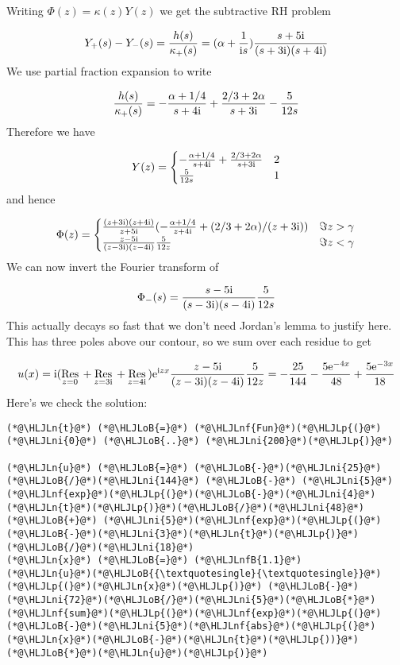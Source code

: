 \documentclass[12pt,landscape]{article}
\newcommand{\HLJLn}[1]{#1}
\newcommand{\HLJLnf}[1]{\textcolor[RGB]{66,102,213}{#1}}
\newcommand{\HLJLnfB}[1]{\textcolor[RGB]{59,151,46}{#1}}
\newcommand{\HLJLni}[1]{\textcolor[RGB]{59,151,46}{#1}}
\newcommand{\HLJLoB}[1]{\textcolor[RGB]{102,102,102}{\textbf{#1}}}
\newcommand{\HLJLp}[1]{#1}
\def\I{ {\rm i} }
\def\E{ {\rm e} }
\def\Res_#1{\underset{#1}{\rm Res}\,}
\begin{document}
{Writing $\Phi(z) = \kappa(z) Y(z)$ we get the subtractive RH problem

\[
Y_+(s) - Y_-(s) = {h(s) \over \kappa_+(s)} =  (\alpha + {1 \over \I s}) {s + 5 \I \over (s + 3 \I)(s + 4 \I)}
\]
We use partial fraction expansion to write

\[
{h(s) \over \kappa_+(s)} = -{\alpha + 1/4 \over s+4 \I} + {2/3 + 2 \alpha \over s+3 \I} - {5 \over 12 s}
\]
Therefore we have

\[
Y(z) = \begin{cases}
-{\alpha + 1/4 \over s+4 \I} + {2/3 + 2 \alpha \over s+3 \I} & 2 \\
        {5 \over 12 s} &1
\end{cases}
\]
and hence

\[
\Phi(z) =      \begin{cases}
{(z+3\I)(z+4\I) \over z+5\I} (-{\ensuremath{\alpha}+1/4 \over z+4\I} + (2/3 + 2\ensuremath{\alpha})/(z+3\I)) & \Im z > \gamma \\
        {z-5\I \over (z-3\I)(z-4\I)} {5 \over 12z}& \Im z < \gamma
        \end{cases}
\]
We can now invert the Fourier transform of

\[
\Phi_-(s) =         {s-5\I \over (s-3\I)(s-4\I)} {5 \over 12s}
\]
This actually decays so fast that we don't need Jordan's lemma to justify here. This has three poles above our contour, so we sum over each residue to get

\[
u(x) = \I (\Res_{z = 0} +\Res_{z = 3 \I } +\Res_{z = 4\I} )      \E^{\I z x }   {z-5\I \over (z-3\I)(z-4\I)} {5 \over 12z} =  -{25 \over 144} - {5 \E^{-4 x}  \over 48} + {5 \E^{-3 x} \over 18}
\]
Here's we check the solution:


\begin{lstlisting}
(*@\HLJLn{t}@*) (*@\HLJLoB{=}@*) (*@\HLJLnf{Fun}@*)(*@\HLJLp{(}@*)(*@\HLJLni{0}@*) (*@\HLJLoB{..}@*) (*@\HLJLni{200}@*)(*@\HLJLp{)}@*)

(*@\HLJLn{u}@*) (*@\HLJLoB{=}@*) (*@\HLJLoB{-}@*)(*@\HLJLni{25}@*)(*@\HLJLoB{/}@*)(*@\HLJLni{144}@*) (*@\HLJLoB{-}@*) (*@\HLJLni{5}@*)(*@\HLJLnf{exp}@*)(*@\HLJLp{(}@*)(*@\HLJLoB{-}@*)(*@\HLJLni{4}@*)(*@\HLJLn{t}@*)(*@\HLJLp{)}@*)(*@\HLJLoB{/}@*)(*@\HLJLni{48}@*) (*@\HLJLoB{+}@*) (*@\HLJLni{5}@*)(*@\HLJLnf{exp}@*)(*@\HLJLp{(}@*)(*@\HLJLoB{-}@*)(*@\HLJLni{3}@*)(*@\HLJLn{t}@*)(*@\HLJLp{)}@*)(*@\HLJLoB{/}@*)(*@\HLJLni{18}@*)
(*@\HLJLn{x}@*) (*@\HLJLoB{=}@*) (*@\HLJLnfB{1.1}@*)
(*@\HLJLn{u}@*)(*@\HLJLoB{{\textquotesingle}{\textquotesingle}}@*)(*@\HLJLp{(}@*)(*@\HLJLn{x}@*)(*@\HLJLp{)}@*) (*@\HLJLoB{-}@*) (*@\HLJLni{72}@*)(*@\HLJLoB{/}@*)(*@\HLJLni{5}@*)(*@\HLJLoB{*}@*)(*@\HLJLnf{sum}@*)(*@\HLJLp{(}@*)(*@\HLJLnf{exp}@*)(*@\HLJLp{(}@*)(*@\HLJLoB{-}@*)(*@\HLJLni{5}@*)(*@\HLJLnf{abs}@*)(*@\HLJLp{(}@*)(*@\HLJLn{x}@*)(*@\HLJLoB{-}@*)(*@\HLJLn{t}@*)(*@\HLJLp{))}@*)(*@\HLJLoB{*}@*)(*@\HLJLn{u}@*)(*@\HLJLp{)}@*)
\end{lstlisting}

}
\end{document}
